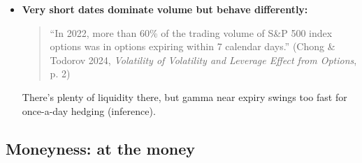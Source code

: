 \documentclass{article}
\begin{document}
\begin{itemize}
\item \textbf{Very short dates dominate volume but behave differently:}

\begin{quote}``In 2022, more than 60\% of the trading volume of S\&P 500 index options was in options expiring within 7 calendar days.'' (Chong \& Todorov 2024, \emph{Volatility of Volatility and Leverage Effect from Options}, p. 2)\end{quote}

There's plenty of liquidity there, but gamma near expiry swings too fast for once-a-day hedging (inference).

\end{itemize}

\subsection{Moneyness: at the money}
\end{document}

